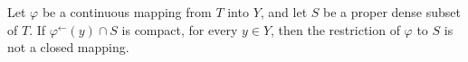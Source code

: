 Let $\varphi$ be a continuous mapping from $T$ into $Y$, and let $S$ be a proper dense subset of $T$. If $\varphi^{\leftarrow}(y) \cap S$ is compact, for every $y \in Y$, then the restriction of $\varphi$ to $S$ is not a closed mapping.
